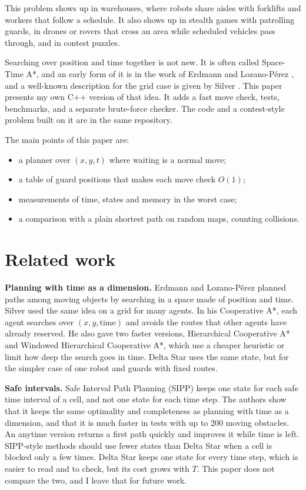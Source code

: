 \documentclass[10pt,letterpaper]{article}
\begin{document}
This problem shows up in warehouses, where robots share aisles with forklifts and workers that follow a schedule. It also shows up in stealth games with patrolling guards, in drones or rovers that cross an area while scheduled vehicles pass through, and in contest puzzles.

Searching over position and time together is not new. It is often called Space-Time A*, and an early form of it is in the work of Erdmann and Lozano-P\'erez \cite{erdmann1987}, and a well-known description for the grid case is given by Silver \cite{silver2005}. This paper presents my own C++ version of that idea. It adds a fast move check, tests, benchmarks, and a separate brute-force checker. The code and a contest-style problem built on it are in the same repository.

The main points of this paper are:
\begin{itemize}\setlength{\itemsep}{0pt}\setlength{\topsep}{2pt}
\item a planner over $(x, y, t)$ where waiting is a normal move;
\item a table of guard positions that makes each move check $O(1)$;
\item measurements of time, states and memory in the worst case;
\item a comparison with a plain shortest path on random maps, counting collisions.
\end{itemize}

\section{Related work}

\textbf{Planning with time as a dimension.} Erdmann and Lozano-P\'erez \cite{erdmann1987} planned paths among moving objects by searching in a space made of position and time. Silver \cite{silver2005} used the same idea on a grid for many agents. In his Cooperative A*, each agent searches over $(x, y, \text{time})$ and avoids the routes that other agents have already reserved. He also gave two faster versions, Hierarchical Cooperative A* and Windowed Hierarchical Cooperative A*, which use a cheaper heuristic or limit how deep the search goes in time. Delta Star uses the same state, but for the simpler case of one robot and guards with fixed routes.

\textbf{Safe intervals.} Safe Interval Path Planning (SIPP) \cite{phillips2011} keeps one state for each safe time interval of a cell, and not one state for each time step. The authors show that it keeps the same optimality and completeness as planning with time as a dimension, and that it is much faster in tests with up to 200 moving obstacles. An anytime version \cite{narayanan2012} returns a first path quickly and improves it while time is left. SIPP-style methods should use fewer states than Delta Star when a cell is blocked only a few times. Delta Star keeps one state for every time step, which is easier to read and to check, but its cost grows with $T$. This paper does not compare the two, and I leave that for future work.
\end{document}
